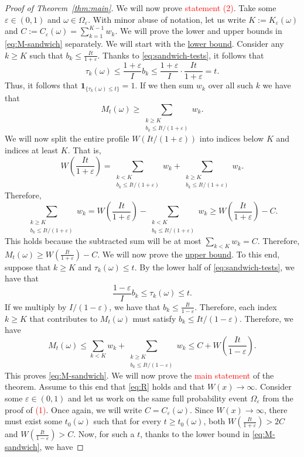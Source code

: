 \documentclass[10pt,a4paper]{amsart}
\newcommand{\ind}[1]{\mathbf{1}_{\{#1\}}}
\begin{document}
\begin{proof}[Proof of Theorem~\ref{thm:main}]
We will now prove \textcolor{red}{statement (2)}. Take some $\varepsilon\in(0,1)$ and $\omega\in\Omega_{\varepsilon}$. With minor abuse of notation, let us write $K:=K_{\varepsilon}(\omega)$ and $C:=C_{\varepsilon}(\omega)=\sum_{k=1}^{K-1}w_k$. We will prove the lower and upper bounds in \eqref{eq:M-sandwich} separately. We will start with the \underline{lower bound}. Consider any $k\ge K$ such that $b_k\le \frac{It}{1+\varepsilon}$. Thanks to \eqref{eq:sandwich-tests}, it follows that
\[
\tau_k(\omega)\le \frac{1+\varepsilon}{I}b_k\le \frac{1+\varepsilon}{I}\cdot\frac{It}{1+\varepsilon} = t.
\]
Thus, it follows that $\ind{\tau_k(\omega)\le t}=1$. If we then sum $w_k$ over all such $k$ we have that
\[
M_t(\omega) \ge \sum_{\substack{k\ge K\\ b_k \le It/(1+\varepsilon)}} w_k.
\]
We will now split the entire profile $W(It/(1+\varepsilon))$ into indices below $K$ and indices at least $K$. That is,
\[
W\left(\frac{It}{1+\varepsilon}\right) = \sum_{\substack{k< K\\ b_k \le It/(1+\varepsilon)}} w_k + \sum_{\substack{k\ge K\\ b_k \le It/(1+\varepsilon)}} w_k.
\]
Therefore,
\[
\sum_{\substack{k\ge K\\ b_k \le It/(1+\varepsilon)}} w_k = W\left(\frac{It}{1+\varepsilon}\right)- \sum_{\substack{k< K\\ b_k \le It/(1+\varepsilon)}} w_k \ge W\left(\frac{It}{1+\varepsilon}\right) - C.
\]
This holds because the subtracted sum will be at most $\sum_{k<K}w_k=C$. Therefore, $M_t(\omega)\ge W\left(\frac{It}{1+\varepsilon}\right)-C$. We will now prove the \underline{upper bound}. To this end, suppose that $k\ge K$ and $\tau_k(\omega)\le t$. By the lower half of \eqref{eq:sandwich-tests}, we have that
\[
\frac{1-\varepsilon}{I}b_k\le \tau_k(\omega)\le t.
\]
If we multiply by $I/(1-\varepsilon)$, we have that $b_k\le \frac{It}{1-\varepsilon}$. Therefore, each index $k\ge K$ that contributes to $M_t(\omega)$ must satisfy $b_k\le It/(1-\varepsilon)$. Therefore, we have
\[
M_t(\omega) \le \sum_{k< K} w_k + \sum_{\substack{k\ge K\\ b_k \le It/(1-\varepsilon)}} w_k \le C + W\left(\frac{It}{1-\varepsilon}\right).
\]
This proves \eqref{eq:M-sandwich}. We will now prove the \textcolor{red}{main statement} of the theorem. Assume to this end that \eqref{eq:R} holds and that $W(x)\to\infty$. Consider some $\varepsilon\in(0,1)$ and let us work on the same full probability event $\Omega_{\varepsilon}$ from the proof of \textcolor{red}{(1)}. Once again, we will write $C=C_{\varepsilon}(\omega)$. Since $W(x)\to\infty$, there must exist some $t_0(\omega)$ such that for every $t\ge t_0(\omega)$, both $W\left(\frac{It}{1+\varepsilon}\right)>2C$ and $W\left(\frac{It}{1-\varepsilon}\right)>C$. Now, for such a $t$, thanks to the lower bound in \eqref{eq:M-sandwich}, we have

\end{proof}
\end{document}

